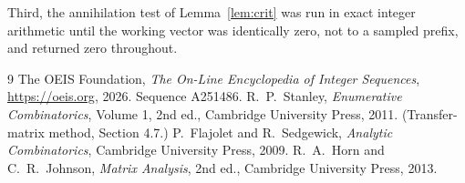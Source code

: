 \documentclass[11pt,a4paper]{article}
\theoremstyle{plain}
\theoremstyle{definition}
\begin{document}
Third, the annihilation test of Lemma~\ref{lem:crit} was run in exact integer arithmetic
until the working vector was identically zero, not to a sampled prefix, and returned zero
throughout.

\begin{thebibliography}{9}
 The OEIS Foundation, \emph{The On-Line Encyclopedia of Integer
Sequences}, \url{https://oeis.org}, 2026. Sequence A251486.
 R.~P.~Stanley, \emph{Enumerative Combinatorics}, Volume 1, 2nd ed.,
Cambridge University Press, 2011. (Transfer-matrix method, Section 4.7.)
 P.~Flajolet and R.~Sedgewick, \emph{Analytic Combinatorics}, Cambridge
University Press, 2009.
 R.~A.~Horn and C.~R.~Johnson, \emph{Matrix Analysis}, 2nd ed., Cambridge
University Press, 2013.
\end{thebibliography}
\end{document}
